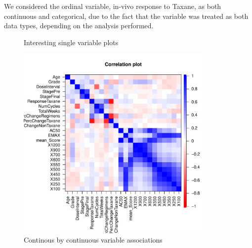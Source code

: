 \documentclass[12pt]{article}
\begin{document}
We considered the ordinal variable, in-vivo response to Taxane, as both continuous and categorical, due to the fact that the variable was treated as both data types, depending on the analysis performed.
\begin{figure}[h]
\caption{Interesting single variable plots}
\centering
{}
\end{figure}
\begin{figure}[h]
\caption{Continous by continuous variable associations}
\centering
\includegraphics[width=0.85\textwidth]{contCor}
\end{figure}
\end{document}
